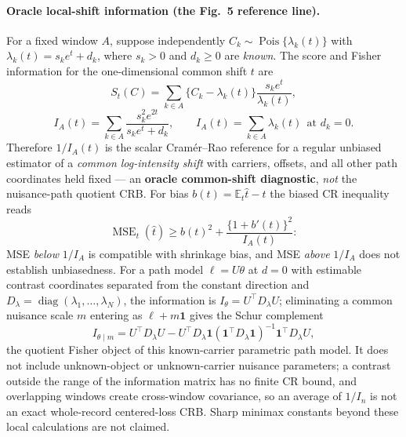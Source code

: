 \paragraph{Oracle local-shift information (the Fig.~5 reference line).} For a fixed window $A$, suppose independently $C_k\sim\operatorname{Pois}\{\lambda_k(t)\}$ with $\lambda_k(t)=s_ke^t+d_k$, where $s_k>0$ and $d_k\ge0$ are \emph{known}. The score and Fisher information for the one-dimensional common shift $t$ are
\[
S_t(C)=\sum_{k\in A}\{C_k-\lambda_k(t)\}\frac{s_ke^t}{\lambda_k(t)},
\]
\begin{equation}
I_A(t)=\sum_{k\in A}\frac{s_k^2e^{2t}}{s_ke^t+d_k},
\qquad
I_A(t)=\sum_{k\in A}\lambda_k(t)\ \ \text{at }d_k=0 .
\tag{D.13}
\end{equation}
Therefore $1/I_A(t)$ is the scalar Cram\'er--Rao reference for a regular unbiased estimator of a \emph{common log-intensity shift} with carriers, offsets, and all other path coordinates held fixed --- an \textbf{oracle common-shift diagnostic}, \emph{not} the nuisance-path quotient CRB. For bias $b(t)=\mathbb E_t\hat t-t$ the biased CR inequality reads
\[
\operatorname{MSE}_t(\hat t)\ge b(t)^2+\frac{\{1+b'(t)\}^2}{I_A(t)} :
\]
MSE \emph{below} $1/I_A$ is compatible with shrinkage bias, and MSE \emph{above} $1/I_A$ does not establish unbiasedness. For a path model $\ell=U\theta$ at $d=0$ with estimable contrast coordinates separated from the constant direction and $D_\lambda=\operatorname{diag}(\lambda_1,\dots,\lambda_N)$, the information is $I_\theta=U^\top D_\lambda U$; eliminating a common nuisance scale $m$ entering as $\ell+m\mathbf1$ gives the Schur complement
\[
I_{\theta\mid m}=U^\top D_\lambda U
-U^\top D_\lambda\mathbf1(\mathbf1^\top D_\lambda\mathbf1)^{-1}\mathbf1^\top D_\lambda U,
\]
the quotient Fisher object of this known-carrier parametric path model. It does not include unknown-object or unknown-carrier nuisance parameters; a contrast outside the range of the information matrix has no finite CR bound, and overlapping windows create cross-window covariance, so an average of $1/I_n$ is not an exact whole-record centered-loss CRB. Sharp minimax constants beyond these local calculations are not claimed.

